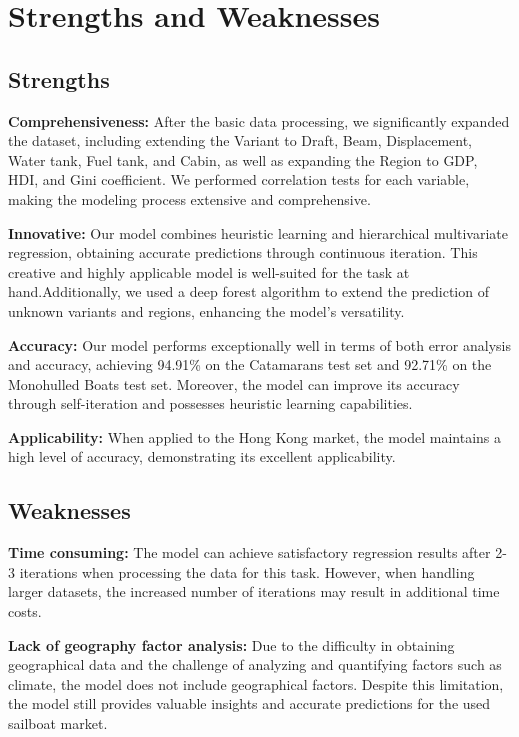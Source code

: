 \documentclass[12pt]{article}  %
\begin{document}
\section{Strengths and Weaknesses}
\subsection{Strengths}

\textbf{Comprehensiveness:}
After the basic data processing, we significantly expanded the dataset, including extending the Variant to Draft, Beam, Displacement, Water tank, Fuel tank, and Cabin, as well as expanding the Region to GDP, HDI, and Gini coefficient. We performed correlation tests for each variable, making the modeling process extensive and comprehensive.

\textbf{Innovative:}
Our model combines heuristic learning and hierarchical multivariate regression, obtaining accurate predictions through continuous iteration. This creative and highly applicable model is well-suited for the task at hand.Additionally, we used a deep forest algorithm to extend the prediction of unknown variants and regions, enhancing the model's versatility. 

\textbf{Accuracy:}
Our model performs exceptionally well in terms of both error analysis and accuracy, achieving 94.91\% on the Catamarans test set and 92.71\% on the Monohulled Boats test set. Moreover, the model can improve its accuracy through self-iteration and possesses heuristic learning capabilities.

\textbf{Applicability:}
When applied to the Hong Kong market, the model maintains a high level of accuracy, demonstrating its excellent applicability. 

\subsection{Weaknesses}
\textbf{Time consuming:}
The model can achieve satisfactory regression results after 2-3 iterations when processing the data for this task. However, when handling larger datasets, the increased number of iterations may result in additional time costs.

\textbf{Lack of geography  factor analysis:}
Due to the difficulty in obtaining geographical data and the challenge of analyzing and quantifying factors such as climate, the model does not include geographical factors. Despite this limitation, the model still provides valuable insights and accurate predictions for the used sailboat market.
\end{document}

